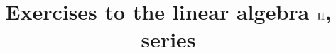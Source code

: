 \documentclass[a4paper,10pt]{article}
\title{Exercises to the linear algebra $\RN{2}$,\\
series }
\author{}
\begin{document}
\maketitle

\section{}
\end{document}
